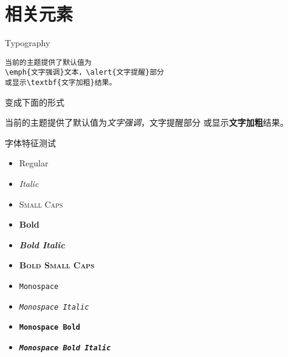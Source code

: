 \documentclass{kw}
\begin{document}
\section{相关元素}

\begin{frame}[fragile]{Typography}
\begin{verbatim}当前的主题提供了默认值为
\emph{文字强调}文本，\alert{文字提醒}部分
或显示\textbf{文字加粗}结果。\end{verbatim}
	
\begin{center}变成下面的形式\end{center}
	
当前的主题提供了默认值为\emph{文字强调}，\alert{文字提醒}部分
或显示\textbf{文字加粗}结果。

\end{frame}



\begin{frame}{字体特征测试}
	\begin{itemize}
		\item Regular
		\item \textit{Italic}
		\item \textsc{Small Caps}
		\item \textbf{Bold}
		\item \textbf{\textit{Bold Italic}}
		\item \textbf{\textsc{Bold Small Caps}}
		\item \texttt{Monospace}
		\item \texttt{\textit{Monospace Italic}}
		\item \texttt{\textbf{Monospace Bold}}
		\item \texttt{\textbf{\textit{Monospace Bold Italic}}}
	\end{itemize}
\end{frame}
\end{document}
